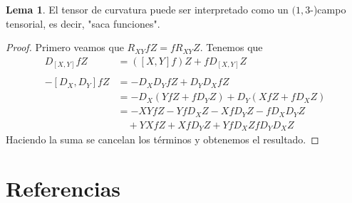 \documentclass[spanish]{book}
\theoremstyle{definition}
\newtheorem*{lema}{Lema}
\begin{document}
	\begin{lema}
		El tensor de curvatura puede ser interpretado como un $(1,3$-)campo tensorial, es decir, "saca funciones".
	\end{lema}
	\begin{proof}
		Primero veamos que $R_{XY}fZ=fR_{XY}Z$. Tenemos que
		\begin{align*}
			D_[X,Y]fZ&=([X,Y]f)Z+fD_{[X,Y]}Z\\\\
			-[D_X,D_Y]fZ&=-D_XD_YfZ+D_YD_XfZ\\
			&=-D_X(YfZ+fD_YZ)+D_Y(XfZ+fD_XZ)\\
			&=-XYfZ-YfD_XZ-XfD_YZ-fD_XD_YZ\\
			&\quad+YXfZ+XfD_YZ+YfD_XZfD_YD_XZ
		\end{align*}
		Haciendo la suma se cancelan los términos y obtenemos el resultado.
	\end{proof}
	
	\chapter{Referencias}
	\printbibliography[heading=none]
	
\end{document}
